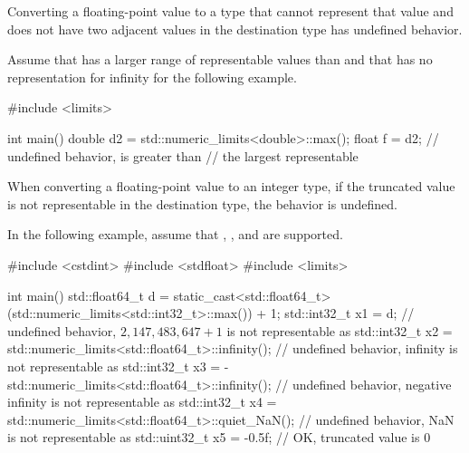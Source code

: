 \pnum
Converting a floating-point value to a type
that cannot represent
that value
and does not have two adjacent values in the destination type
has undefined behavior.

\pnum
\begin{example}
Assume that 
has a larger range of representable values
than 
and that 
has no representation for infinity
for the following example.
\begin{codeblock}
#include <limits>

int main() {
  double d2 = std::numeric_limits<double>::max();
  float f = d2;     // undefined behavior,  is greater than
                    // the largest representable 
}
\end{codeblock}
\end{example}


\pnum
When converting a floating-point value to an integer type, if
the truncated value
is not representable in the destination type,
the behavior is undefined.

\pnum
\begin{example}
In the following example, assume that
, , and 
are supported.
\begin{codeblock}
#include <cstdint>
#include <stdfloat>
#include <limits>

int main() {
  std::float64_t d  = static_cast<std::float64_t>(std::numeric_limits<std::int32_t>::max()) + 1;
  std::int32_t   x1 = d;        // undefined behavior, $2{,}147{,}483{,}647 + 1$ is not representable as 
  std::int32_t   x2 = std::numeric_limits<std::float64_t>::infinity();
                                // undefined behavior, infinity is not representable as 
  std::int32_t   x3 = -std::numeric_limits<std::float64_t>::infinity();
                                // undefined behavior, negative infinity is not representable as 
  std::int32_t   x4 = std::numeric_limits<std::float64_t>::quiet_NaN();
                                // undefined behavior, NaN is not representable as 
  std::uint32_t  x5 = -0.5f;    // OK, truncated value is $0$
}
\end{codeblock}
\end{example}


